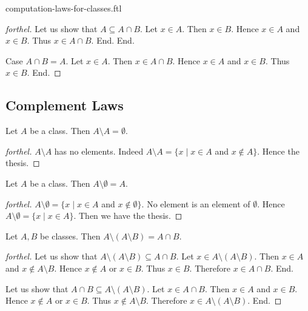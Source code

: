 \documentclass{naproche-library}
\begin{document}
\begin{smodule}{computation-laws-for-classes.ftl}
\begin{proof}[forthel]
      Let us show that $A \subseteq A \cap B$.
        Let $x \in A$.
        Then $x \in B$.
        Hence $x \in A$ and $x \in B$.
        Thus $x \in A \cap B$.
      End.
    End.

    Case $A \cap B = A$.
      Let $x \in A$.
      Then $x \in A \cap B$.
      Hence $x \in A$ and $x \in B$.
      Thus $x \in B$.
    End.
  \end{proof}


  \subsection*{Complement Laws}

  \begin{proposition}[forthel,id=FOUNDATIONS_02_7433299337150464]
    Let $A$ be a class.
    Then $A \setminus A = \emptyset$.
  \end{proposition}
  \begin{proof}[forthel]
    $A \setminus A$ has no elements.
    Indeed $A \setminus A = \{ x \mid x \in A$ and $x \notin A \}$.
    Hence the thesis.
  \end{proof}

  \begin{proposition}[forthel,id=FOUNDATIONS_02_3783696985358336]
    Let $A$ be a class.
    Then $A \setminus \emptyset = A$.
  \end{proposition}
  \begin{proof}[forthel]
    $A \setminus \emptyset = \{ x \mid x \in A$ and $x \notin \emptyset \}$.
    No element is an element of $\emptyset$.
    Hence $A \setminus \emptyset = \{ x \mid x \in A \}$.
    Then we have the thesis.
  \end{proof}

  \begin{proposition}[forthel,id=FOUNDATIONS_02_7083929257377792]
    Let $A, B$ be classes.
    Then $A \setminus (A \setminus B) = A \cap B$.
  \end{proposition}
  \begin{proof}[forthel]
    Let us show that $A \setminus (A \setminus B) \subseteq A \cap B$.
      Let $x \in A \setminus (A \setminus B)$.
      Then $x \in A$ and $x \notin A \setminus B$.
      Hence $x \notin A$ or $x \in B$.
      Thus $x \in B$.
      Therefore $x \in A \cap B$.
    End.

    Let us show that $A \cap B \subseteq A \setminus (A \setminus B)$.
      Let $x \in A \cap B$.
      Then $x \in A$ and $x \in B$.
      Hence $x \notin A$ or $x \in B$.
      Thus $x \notin A \setminus B$.
      Therefore $x \in A \setminus (A \setminus B)$.
    End.
  \end{proof}


\end{smodule}
\end{document}

